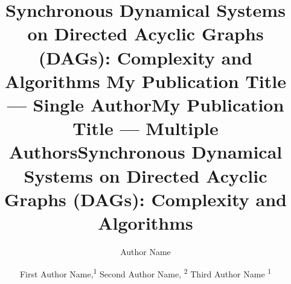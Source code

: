 \documentclass[letterpaper]{article} %
\title{Synchronous Dynamical Systems on Directed Acyclic Graphs (DAGs):
       Complexity and Algorithms
}
\author{
\iffalse
    Written by AAAI Press Staff\textsuperscript{\rm 1}\thanks{With help from the AAAI Publications Committee.}\\
    AAAI Style Contributions by Pater Patel Schneider,
    Sunil Issar,  \\
    J. Scott Penberthy,
    George Ferguson,
    Hans Guesgen,
    Francisco Cruz,
    Marc Pujol-Gonzalez
    \\
\fi
}
\title{My Publication Title --- Single Author}
\author {
    Author Name \\
}
\title{My Publication Title --- Multiple Authors}
\author {

        First Author Name,\textsuperscript{\rm 1}
        Second Author Name, \textsuperscript{\rm 2}
        Third Author Name \textsuperscript{\rm 1} \\
}
\title{Synchronous Dynamical Systems on Directed Acyclic Graphs (DAGs):\newline
       Complexity and Algorithms}
\author{}
\begin{document}
\linenumbers  %

\newtheorem{theorem}{Theorem}[section]
\newtheorem{lemma}{Lemma}[section]
\newtheorem{corollary}{Corollary}[section]
\newtheorem{fact}{Fact}[section]
\newtheorem{definition}{Definition}[section]
\newtheorem{proposition}{Proposition}[section]
\newtheorem{observation}{Observation}[section]
\newtheorem{claim}{Claim}[section]

\newcommand{\cnp}{\textbf{NP}}
\newcommand{\true}{\texttt{True}}
\newcommand{\false}{\texttt{False}}

\newcommand{\QED}{\hfill\rule{2mm}{2mm}}

\newcommand{\irange}{\mbox{$1 \leq i \leq n$}}
\newcommand{\jrange}{\mbox{$1 \leq j \leq m$}}

\newcommand{\dunder}[1]{\underline{\underline{#1}}}

\newcommand{\cals}{\mbox{$\mathcal{S}$}}
\newcommand{\calc}{\mbox{$\mathcal{C}$}}
\newcommand{\calcp}{\mbox{$\mathcal{C'}$}}
\newcommand{\cald}{\mbox{$\mathcal{D}$}}
\newcommand{\call}{\mbox{$\mathcal{L}$}}
\newcommand{\calf}{\mbox{$\mathcal{F}$}}

\newcommand{\calco}{\mbox{$\mathcal{C}_{1}$}}
\newcommand{\calcz}{\mbox{$\mathcal{C}_0$}}
\newcommand{\calci}{\mbox{$\mathcal{C}_i$}}
\newcommand{\calcipo}{\mbox{$\mathcal{C}_{i+1}$}}
\newcommand{\calct}{\mbox{$\mathcal{C}_{t}$}}
\newcommand{\calctmo}{\mbox{$\mathcal{C}_{t-1}$}}
\newcommand{\dcare}{\texttt{x}}

\newcommand{\genprob}{\mbox{\textsc{CSC}}}
\newcommand{\pre}{\textsc{Pre}}
\newcommand{\npre}{\textsc{\#Pre}}

\maketitle

\begin{abstract}

\end{abstract}
























\clearpage


%

\end{document}
